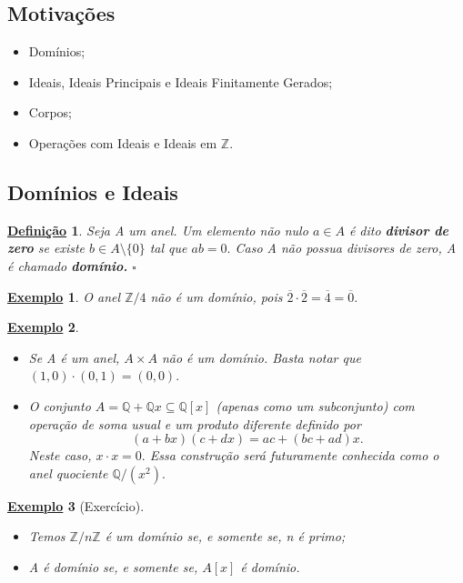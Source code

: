 \documentclass{article}
\newtheorem*{def*}{\underline{Defini\c c\~ao}}
\newtheorem{example}{\underline{Exemplo}}
\begin{document}
\subsection{Motivações}
\begin{itemize}
  \item Domínios;
  \item Ideais, Ideais Principais e Ideais Finitamente Gerados;
  \item Corpos;
  \item Operações com Ideais e Ideais em \(\mathbb{Z}\).
\end{itemize}
\subsection{Domínios e Ideais}
\begin{def*}
  Seja A um anel. Um elemento não nulo \(a\in A\) é dito \textbf{divisor de zero} se existe \(b\in A\setminus{\{0\}}\) tal que
  \(ab = 0.\) Caso A não possua divisores de zero, A é chamado \textbf{domínio.} \(\square\)
\end{def*}
\begin{example}
  O anel \(\mathbb{Z}/4\) não é um domínio, pois \(\overline{2}\cdot \overline{2} = \overline{4} = \overline{0}.\)
\end{example}
\begin{example}
  \begin{itemize}
    \item[1)] Se A é um anel, \(A\times A\) não é um domínio. Basta notar que \((1, 0)\cdot (0, 1) = (0, 0).\)
    \item[2)] O conjunto \(A = \mathbb{Q} + \mathbb{Q}x \subseteq{\mathbb{Q}[x]}\) (apenas como um subconjunto) com operação de soma usual e um
      produto diferente definido por 
      \[
        (a+bx)(c+dx) = ac + (bc+ad)x.
      \]
      Neste caso, \(x \cdot x = 0.\) Essa construção será futuramente conhecida como o anel quociente \(\mathbb{Q}/(x^{2}).\)
  \end{itemize}
\end{example}
\begin{example}[Exercício]
  \begin{itemize}
    \item[1)] Temos \(\mathbb{Z}/n \mathbb{Z}\) é um domínio se, e somente se, n é primo;
    \item[2)] A é domínio se, e somente se, \(A[x]\) é domínio.
  \end{itemize}
\end{example}
\end{document}
